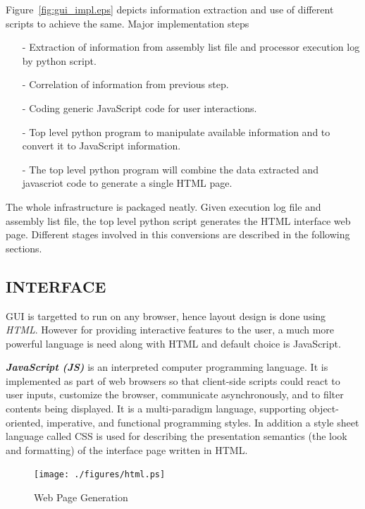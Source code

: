 Figure~\ref{fig:gui_impl.eps} depicts information extraction and use of different scripts to achieve the same. Major implementation steps
\begin{itemize}
\item[-] Extraction of information from assembly list file and processor execution log by python script.
\item[-] Correlation of information from previous step.
\item[-] Coding generic JavaScript code for user interactions.
\item[-] Top level python program to manipulate available information and to convert it to JavaScript information. 
\item[-] The top level python program will combine the data extracted and javascriot code to generate a single HTML page. 
\end{itemize}

The whole infrastructure is packaged neatly. Given execution log file and assembly list file, the top level python script generates the HTML interface web page. Different stages involved in this conversions are described in the following sections. 

\subsection {INTERFACE}
GUI is targetted to run on any browser, hence layout design is done using {\it HTML}. However for providing interactive features to the user, a much more powerful language is need along with HTML and default choice is JavaScript.

\emph {\bf JavaScript (JS)} is an interpreted computer programming language. It is  implemented as part of web browsers so that client-side scripts could react to user inputs, customize the browser, communicate asynchronously, and to filter contents being displayed. It is a multi-paradigm language, supporting object-oriented, imperative, and functional programming styles.  
In addition a style sheet language called CSS is used for describing the presentation semantics (the look and formatting) of the interface page written in HTML.

\begin{figure}[h]
\centering
\texttt{[image: ./figures/html.ps]}
\caption{Web Page Generation}
\label{fig:impl:wpg}
\end{figure}

